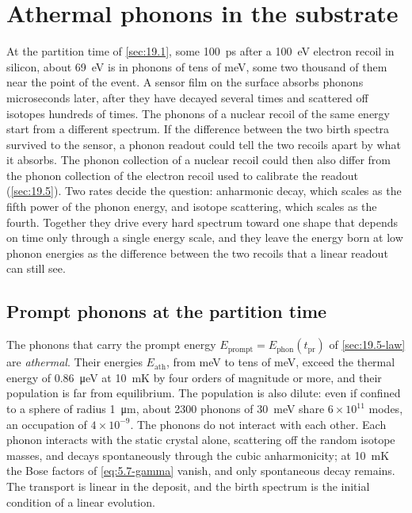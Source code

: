 \section{Athermal phonons in the substrate}\label{sec:20.2}

At the partition time of \cref{sec:19.1}, some \SI{100}{ps} after a \SI{100}{eV} electron recoil in silicon, about \SI{69}{eV} is in phonons of tens of meV, some two thousand of them near the point of the event. A sensor film on the surface absorbs phonons microseconds later, after they have decayed several times and scattered off isotopes hundreds of times. The phonons of a nuclear recoil of the same energy start from a different spectrum. If the difference between the two birth spectra survived to the sensor, a phonon readout could tell the two recoils apart by what it absorbs. The phonon collection of a nuclear recoil could then also differ from the phonon collection of the electron recoil used to calibrate the readout (\cref{sec:19.5}). Two rates decide the question: anharmonic decay, which scales as the fifth power of the phonon energy, and isotope scattering, which scales as the fourth. Together they drive every hard spectrum toward one shape that depends on time only through a single energy scale, and they leave the energy born at low phonon energies as the difference between the two recoils that a linear readout can still see.

\subsection{Prompt phonons at the partition time}\label{sec:20.2-prompt}

The phonons that carry the prompt energy $E_{\mathrm{prompt}} = E_{\mathrm{phon}}(t_{\mathrm{pr}})$ of \cref{sec:19.5-law} are \emph{athermal}. Their energies $E_{\mathrm{ath}}$, from meV to tens of meV, exceed the thermal energy of \SI{0.86}{\micro eV} at \SI{10}{mK} by four orders of magnitude or more, and their population is far from equilibrium. The population is also dilute: even if confined to a sphere of radius \SI{1}{\micro m}, about 2300 phonons of \SI{30}{meV} share $6\times10^{11}$ modes, an occupation of $4\times10^{-9}$. The phonons do not interact with each other. Each phonon interacts with the static crystal alone, scattering off the random isotope masses, and decays spontaneously through the cubic anharmonicity; at \SI{10}{mK} the Bose factors of \cref{eq:5.7-gamma} vanish, and only spontaneous decay remains. The transport is linear in the deposit, and the birth spectrum is the initial condition of a linear evolution.

